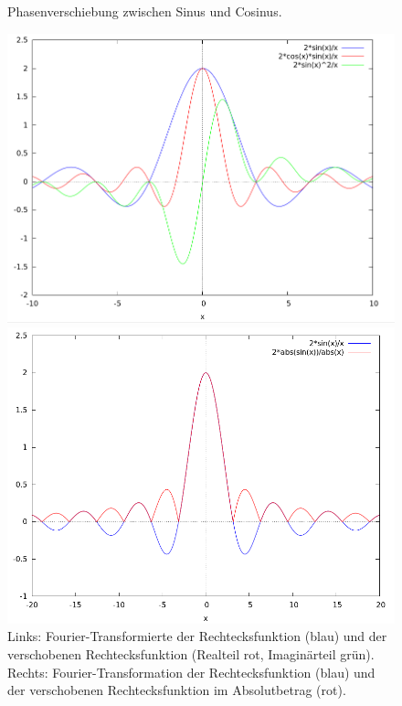 \begin{remark}
\begin{description}
\begin{figure}[ht]
{        Phasenverschiebung zwischen Sinus und Cosinus.}
      \label{fig:Rechteck12}
    \end{figure}
    \begin{figure}[ht]
      \centering
      \begin{minipage}{0.49\linewidth}
        \centering
        \includegraphics[width=\linewidth]{Bilder/Rechteck3}
      \end{minipage}
      \begin{minipage}{0.49\linewidth}
        \centering
        \includegraphics[width=\linewidth]{Bilder/Rechteck4}
      \end{minipage}
      \caption{Links: Fourier-Transformierte der Rechtecksfunktion (blau) und der verschobenen
        Rechtecksfunktion (Realteil rot, Imaginärteil grün). Rechts: Fourier-Transformation der
        Rechtecksfunktion (blau) und der verschobenen Rechtecksfunktion im Absolutbetrag (rot).}
      \label{fig:Rechteck34}
    \end{figure}
		

\end{description}
\end{remark}
